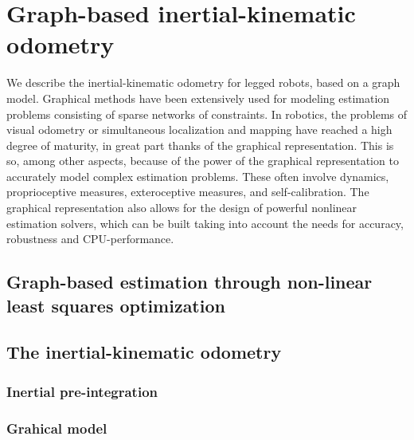 
\section{Graph-based inertial-kinematic odometry}

We describe the inertial-kinematic odometry for legged robots, based on a graph model. 
Graphical methods have been extensively used for modeling estimation problems consisting of sparse networks of constraints. 
In robotics, the problems of visual odometry or simultaneous localization and mapping have reached a high degree of maturity, in great part thanks of the graphical representation. 
This is so, among other aspects, because of the power of the graphical representation to accurately model complex estimation problems. 
These often involve dynamics, proprioceptive measures, exteroceptive measures, and self-calibration. 
The graphical representation also allows for the design of powerful nonlinear estimation solvers, which can be built taking into account the needs for accuracy, robustness and CPU-performance.

\subsection{Graph-based estimation through non-linear least squares optimization}

\subsection{The inertial-kinematic odometry}

\subsubsection{Inertial pre-integration}

\subsubsection{Grahical model}

